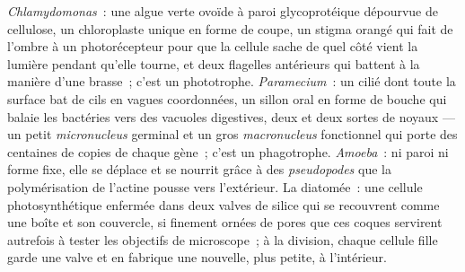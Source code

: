 \begin{example}\label{ex:b2:unicellular-diversity:four}
\emph{Chlamydomonas}~: une algue verte ovoïde à paroi glycoprotéique
dépourvue de cellulose, un chloroplaste unique en forme de coupe, un
stigma orangé qui fait de l'ombre à un photorécepteur pour que la
cellule sache de quel côté vient la lumière pendant qu'elle tourne, et
deux flagelles antérieurs qui battent à la manière d'une brasse~; c'est
un phototrophe. \emph{Paramecium}~: un cilié dont toute la surface bat
de cils en vagues coordonnées, un sillon oral en forme de bouche qui
balaie les bactéries vers des vacuoles digestives, deux  et deux sortes de noyaux --- un petit
\emph{micronucleus} germinal et un gros \emph{macronucleus}
fonctionnel qui porte des centaines de copies de chaque gène~; c'est un
phagotrophe. \emph{Amoeba}~: ni paroi ni forme fixe, elle se déplace et
se nourrit grâce à des \emph{pseudopodes} que la polymérisation de
l'actine pousse vers l'extérieur. La diatomée~: une cellule
photosynthétique enfermée dans deux valves de silice qui se recouvrent
comme une boîte et son couvercle, si finement ornées de pores que ces
coques servirent autrefois à tester les objectifs de microscope~; à la
division, chaque cellule fille garde une valve et en fabrique une
nouvelle, plus petite, à l'intérieur.
\end{example}

